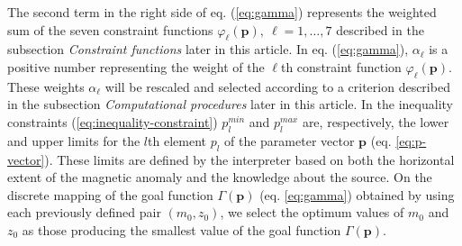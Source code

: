 The second term in the right side of eq. (\ref{eq:gamma}) represents the weighted sum of
the seven constraint functions $\varphi_{\ell}(\mathbf{p}), \: \ell = 1, \dots, 7$ 
described in the subsection \textit{Constraint functions} later in this article.
In eq.  (\ref{eq:gamma}), $\alpha_{\ell}$ is a positive number representing 
the weight of the $\ell$th constraint function $\varphi_{\ell}(\mathbf{p})$.
These weights $\alpha_{\ell}$ will be rescaled and selected according to a criterion described in the subsection \textit{Computational procedures} later in this article.
In the inequality constraints (\ref{eq:inequality-constraint}) 
$p_{l}^{min}$ and $p_{l}^{max}$ are, respectively, the lower and upper limits for the $l$th element $p_{l}$ of the parameter vector $\mathbf{p}$ (eq. \ref{eq:p-vector}). 
These limits are defined by the interpreter 
based on both the horizontal extent of the magnetic anomaly and the knowledge about the 
source.
On the discrete mapping of the goal function $\Gamma (\mathbf{p})$ 
(eq. \ref{eq:gamma}) obtained by using each previously defined pair $(m_{0}, z_{0})$, 
we select the optimum values of $m_{0}$ and $z_{0}$ 
as those producing the smallest value of the goal function $\Gamma (\mathbf{p})$.

